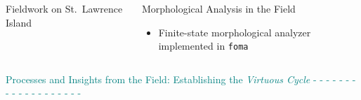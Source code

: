 \documentclass[usenames,dvipsnames]{beamer}
\begin{document}
\begin{frame}[fragile]
\begin{columns}[t]
\begin{column}{0.29\textwidth}
\begin{block}{Fieldwork on St.~Lawrence Island}
\end{block}
\end{column}

\begin{column}{0.29\textwidth}
\begin{block}{Morphological Analysis in the Field}

\begin{itemize}
    \item Finite-state morphological analyzer implemented in \texttt{foma} \citep{Hulden:2009}
\end{itemize}

\end{block}
\end{column}

\end{columns}

\vspace{28pt}

{\LARGE \textcolor{orange}{\textbf{\PencilLeftDown}} \textcolor{teal}{Processes and Insights from the Field: Establishing the \textit{Virtuous Cycle} - - - - - - - - - - - - - - - - - - -}}

\vspace{28pt}

\begin{columns}


\end{columns}
\end{frame}
\end{document}
